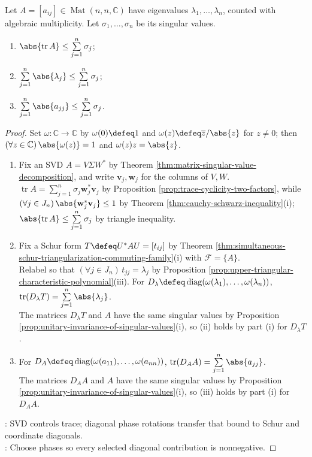\begin{theorem} \label{thm:trace-bounded-by-singular-values} \\
Let $A=[a_{ij}]\in\operatorname{Mat}(n,n,\mathbb{C})$ have eigenvalues $\lambda_1,\ldots,\lambda_n$, counted with algebraic multiplicity. Let $\sigma_1,\ldots,\sigma_n$ be its singular values.
\begin{enumerate}[label=(\roman*)]
\setlength{\itemsep}{0pt}
\item $\abs{\operatorname{tr}A}\leq\sum\limits_{j=1}^{n}\sigma_j$;
\item $\sum\limits_{j=1}^{n}\abs{\lambda_j}\leq\sum\limits_{j=1}^{n}\sigma_j$;
\item $\sum\limits_{j=1}^{n}\abs{a_{jj}}\leq\sum\limits_{j=1}^{n}\sigma_j$.
\end{enumerate}
\begin{proof}
Set $\omega:\mathbb{C}\to\mathbb{C}$ by $\omega(0)\defeq1$ and $\omega(z)\defeq\overline{z}/\abs{z}$ for $z\neq0$; then $(\forall z\in\mathbb{C})\,\abs{\omega(z)}=1$ and $\omega(z)z=\abs{z}$.
\begin{enumerate}[label=(\roman*)]
\setlength{\itemsep}{0pt}
\item Fix an SVD $A=V\Sigma W^*$ by Theorem \ref{thm:matrix-singular-value-decomposition}, and write $\mathbf{v}_j,\mathbf{w}_j$ for the columns of $V,W$.\\
$\operatorname{tr}A=\sum\limits_{j=1}^{n}\sigma_j\mathbf{w}_j^*\mathbf{v}_j$ by Proposition \ref{prop:trace-cyclicity-two-factors}, while $(\forall j\in J_n)\,\abs{\mathbf{w}_j^*\mathbf{v}_j}\leq1$ by Theorem \ref{thm:cauchy-schwarz-inequality}(i); $\abs{\operatorname{tr}A}\leq\sum\limits_{j=1}^{n}\sigma_j$ by triangle inequality.
\item Fix a Schur form $T\defeq U^*AU=[t_{ij}]$ by Theorem \ref{thm:simultaneous-schur-triangularization-commuting-family}(i) with $\mathcal{F}=\{A\}$.\\
Relabel so that $(\forall j\in J_n)\,t_{jj}=\lambda_j$ by Proposition \ref{prop:upper-triangular-characteristic-polynomial}(iii). For $D_\lambda\defeq\operatorname{diag}(\omega(\lambda_1),\ldots,\omega(\lambda_n))$, $\operatorname{tr}(D_\lambda T)=\sum\limits_{j=1}^{n}\abs{\lambda_j}$.\\
The matrices $D_\lambda T$ and $A$ have the same singular values by Proposition \ref{prop:unitary-invariance-of-singular-values}(i), so (ii) holds by part (i) for $D_\lambda T$.
\item For $D_A\defeq\operatorname{diag}(\omega(a_{11}),\ldots,\omega(a_{nn}))$, $\operatorname{tr}(D_AA)=\sum\limits_{j=1}^{n}\abs{a_{jj}}$.\\
The matrices $D_AA$ and $A$ have the same singular values by Proposition \ref{prop:unitary-invariance-of-singular-values}(i), so (iii) holds by part (i) for $D_AA$.
\end{enumerate}
: SVD controls trace; diagonal phase rotations transfer that bound to Schur and coordinate diagonals.\\
: Choose phases so every selected diagonal contribution is nonnegative.
\end{proof}
\end{theorem}
